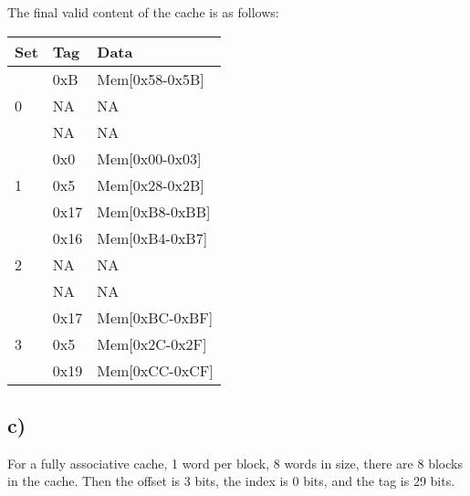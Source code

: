 \documentclass[a4paper,12pt]{article}
\begin{document}
The final valid content of the cache is as follows:

\begin{table}[H]
	\centering	
	\begin{tabular}{lll}
		\toprule
		Set & Tag & Data \\
		\midrule
		\multirow{3}{*}{0} & 0xB & Mem[0x58-0x5B] \\
		& NA & NA \\
		& NA & NA \\
		\midrule
		\multirow{3}{*}{1} & 0x0 & Mem[0x00-0x03] \\
		& 0x5 & Mem[0x28-0x2B] \\
		& 0x17 & Mem[0xB8-0xBB] \\
		\midrule
		\multirow{3}{*}{2} & 0x16 & Mem[0xB4-0xB7] \\
		& NA & NA \\
		& NA & NA \\
		\midrule
		\multirow{3}{*}{3} & 0x17 & Mem[0xBC-0xBF] \\
		& 0x5 & Mem[0x2C-0x2F] \\
		& 0x19 & Mem[0xCC-0xCF] \\
		\bottomrule
	\end{tabular}
\end{table}

\subsection*{c)}

For a fully associative cache, 1 word per block, 8 words in size, there are 8 blocks in the cache. 
Then the offset is 3 bits, the index is 0 bits, and the tag is 29 bits.
\end{document}
